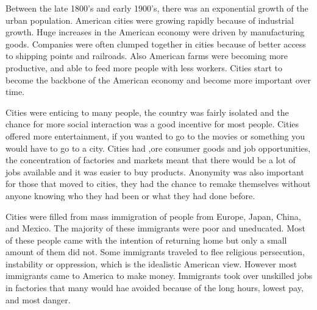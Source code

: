 Between the late 1800's and early 1900's, there was an exponential growth of the urban population.
American cities were growing rapidly because of industrial growth.
Huge increases in the American economy were driven by manufacturing goods.
Companies were often clumped together in cities because of better access to shipping points and railroads. 
Also American farms were becoming more productive, and able to feed more people with less workers.
Cities start to become the backbone of the American economy and become more important over time.

Cities were enticing to many people, the country was fairly isolated and the chance for more social interaction was a good incentive for most people.
Cities offered more entertainment, if you wanted to go to the movies or something you would have to go to a city.
Cities had ,ore consumer goods and job opportunities, the concentration of factories and markets meant that there would be a lot of jobs available and it was easier to buy products.
Anonymity was also important for those that moved to cities, they had the chance to remake themselves without anyone knowing who they had been or what they had done before.

Cities were filled from mass immigration of people from Europe, Japan, China, and Mexico.
The majority of these immigrants were poor and uneducated.
Most of these people came with the intention of returning home but only a small amount of them did not.
Some immigrants traveled to flee religious persecution, instability or oppression, which is the idealistic American view.
However most immigrants came to America to make money.
Immigrants took over unskilled jobs in factories that many would hae avoided because of the long hours, lowest pay, and most danger.